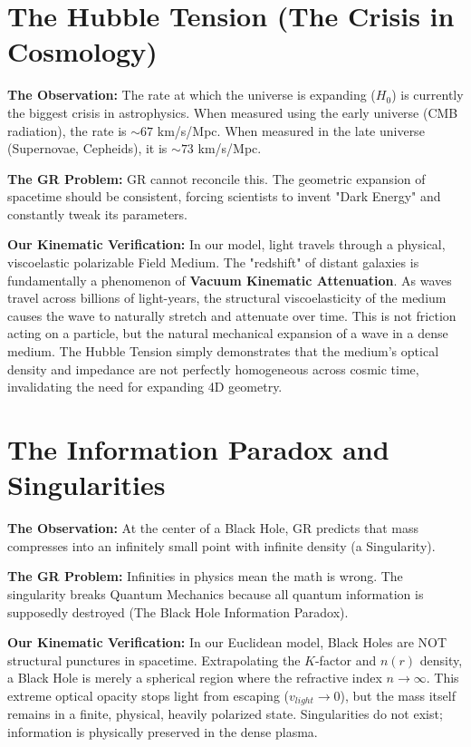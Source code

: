 \documentclass[reprint,amsmath,amssymb,aps,prd,twocolumn]{revtex4-2}
\begin{document}
\section{The Hubble Tension (The Crisis in Cosmology)}
\textbf{The Observation:} The rate at which the universe is expanding ($H_0$) is currently the biggest crisis in astrophysics. When measured using the early universe (CMB radiation), the rate is $\sim 67$ km/s/Mpc. When measured in the late universe (Supernovae, Cepheids), it is $\sim 73$ km/s/Mpc.

\textbf{The GR Problem:} GR cannot reconcile this. The geometric expansion of spacetime should be consistent, forcing scientists to invent "Dark Energy" and constantly tweak its parameters.

\textbf{Our Kinematic Verification:} In our model, light travels through a physical, viscoelastic polarizable Field Medium. The "redshift" of distant galaxies is fundamentally a phenomenon of \textbf{Vacuum Kinematic Attenuation}. As waves travel across billions of light-years, the structural viscoelasticity of the medium causes the wave to naturally stretch and attenuate over time. This is not friction acting on a particle, but the natural mechanical expansion of a wave in a dense medium. The Hubble Tension simply demonstrates that the medium's optical density and impedance are not perfectly homogeneous across cosmic time, invalidating the need for expanding 4D geometry.

\section{The Information Paradox and Singularities}
\textbf{The Observation:} At the center of a Black Hole, GR predicts that mass compresses into an infinitely small point with infinite density (a Singularity).

\textbf{The GR Problem:} Infinities in physics mean the math is wrong. The singularity breaks Quantum Mechanics because all quantum information is supposedly destroyed (The Black Hole Information Paradox).

\textbf{Our Kinematic Verification:} In our Euclidean model, Black Holes are NOT structural punctures in spacetime. Extrapolating the $K$-factor and $n(r)$ density, a Black Hole is merely a spherical region where the refractive index $n \to \infty$. This extreme optical opacity stops light from escaping ($v_{light} \to 0$), but the mass itself remains in a finite, physical, heavily polarized state. Singularities do not exist; information is physically preserved in the dense plasma.
\end{document}

